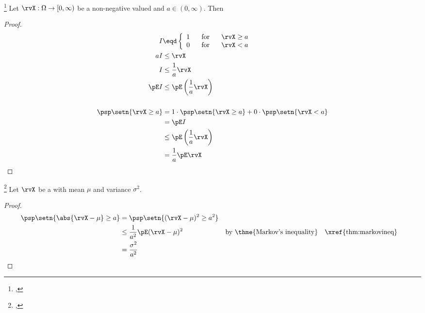 \begin{theorem}
\footnote{
  ,
  }
\label{thm:markovineq}
Let $\rvX:\Omega\to[0,\infty)$ be a non-negative valued  and
$a\in(0,\infty)$. Then
\end{theorem}
\begin{proof}
\begin{align*}
  I &\eqd \left\{ \begin{array}{l@{\hspace{4ex}\mbox{for}\hspace{4ex}}l}
    1 &\rvX\ge a \\
    0 &\rvX < a
    \end{array}\right.
\\
  aI &\le\rvX           \\
   I &\le \frac{1}{a}\rvX \\
   \pE I &\le \pE\left(\frac{1}{a}\rvX\right) \\
\\
   \psp\setn{\rvX\ge a}
     &= 1\cdot\psp\setn{\rvX\ge a} + 0\cdot\psp\setn{\rvX<a}
   \\&= \pE I
   \\&\le \pE\left(\frac{1}{a}\rvX \right)
   \\&=   \frac{1}{a}\pE\rvX
\end{align*}
\end{proof}

\begin{theorem}
\footnote{
  ,
  }
Let $\rvX$ be a  with mean $\mu$ and variance $\sigma^2$.
\end{theorem}
\begin{proof}
\begin{align*}
  \psp\setn{\abs{\rvX-\mu} \ge a}
    &=   \psp\setn{ (\rvX-\mu)^2 \ge a^2}
  \\&\le \frac{1}{a^2} \pE(\rvX-\mu)^2 
    && \text{by \thme{Markov's inequality}}
    && \text{\xref{thm:markovineq}}
  \\&=   \frac{\sigma^2}{a^2}
\end{align*}
\end{proof}

